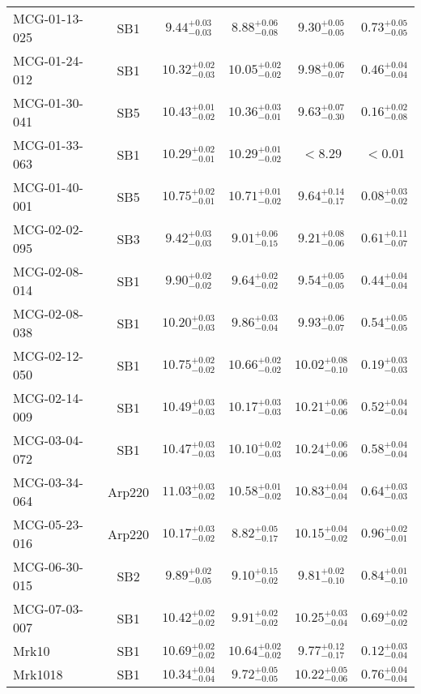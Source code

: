 \documentclass[onecolumn]{mn2e}
\begin{document}
{\begin{center}
\begin{longtable}{lccccc}
MCG-01-13-025 & SB1 & $9.44_{-0.03}^{+0.03}$ & $8.88_{-0.08}^{+0.06}$ & $9.30_{-0.05}^{+0.05}$ &$0.73_{-0.05}^{+0.05}$ \\
MCG-01-24-012 & SB1 & $10.32_{-0.03}^{+0.02}$ & $10.05_{-0.02}^{+0.02}$ & $9.98_{-0.07}^{+0.06}$ &$0.46_{-0.04}^{+0.04}$ \\
MCG-01-30-041 & SB5 & $10.43_{-0.02}^{+0.01}$ & $10.36_{-0.01}^{+0.03}$ & $9.63_{-0.30}^{+0.07}$ &$0.16_{-0.08}^{+0.02}$ \\
MCG-01-33-063 & SB1 & $10.29_{-0.01}^{+0.02}$ & $10.29_{-0.02}^{+0.01}$ & $<8.29$ &$<0.01$ \\
MCG-01-40-001 & SB5 & $10.75_{-0.01}^{+0.02}$ & $10.71_{-0.02}^{+0.01}$ & $9.64_{-0.17}^{+0.14}$ &$0.08_{-0.02}^{+0.03}$ \\
MCG-02-02-095 & SB3 & $9.42_{-0.03}^{+0.03}$ & $9.01_{-0.15}^{+0.06}$ & $9.21_{-0.06}^{+0.08}$ &$0.61_{-0.07}^{+0.11}$ \\
MCG-02-08-014 & SB1 & $9.90_{-0.02}^{+0.02}$ & $9.64_{-0.02}^{+0.02}$ & $9.54_{-0.05}^{+0.05}$ &$0.44_{-0.04}^{+0.04}$ \\
MCG-02-08-038 & SB1 & $10.20_{-0.03}^{+0.03}$ & $9.86_{-0.04}^{+0.03}$ & $9.93_{-0.07}^{+0.06}$ &$0.54_{-0.05}^{+0.05}$ \\
MCG-02-12-050 & SB1 & $10.75_{-0.02}^{+0.02}$ & $10.66_{-0.02}^{+0.02}$ & $10.02_{-0.10}^{+0.08}$ &$0.19_{-0.03}^{+0.03}$ \\
MCG-02-14-009 & SB1 & $10.49_{-0.03}^{+0.03}$ & $10.17_{-0.03}^{+0.03}$ & $10.21_{-0.06}^{+0.06}$ &$0.52_{-0.04}^{+0.04}$ \\
MCG-03-04-072 & SB1 & $10.47_{-0.03}^{+0.03}$ & $10.10_{-0.03}^{+0.02}$ & $10.24_{-0.06}^{+0.06}$ &$0.58_{-0.04}^{+0.04}$ \\
MCG-03-34-064 & Arp220 & $11.03_{-0.02}^{+0.03}$ & $10.58_{-0.02}^{+0.01}$ & $10.83_{-0.04}^{+0.04}$ &$0.64_{-0.03}^{+0.03}$ \\
MCG-05-23-016 & Arp220 & $10.17_{-0.02}^{+0.03}$ & $8.82_{-0.17}^{+0.05}$ & $10.15_{-0.02}^{+0.04}$ &$0.96_{-0.01}^{+0.02}$ \\
MCG-06-30-015 & SB2 & $9.89_{-0.05}^{+0.02}$ & $9.10_{-0.02}^{+0.15}$ & $9.81_{-0.10}^{+0.02}$ &$0.84_{-0.10}^{+0.01}$ \\
MCG-07-03-007 & SB1 & $10.42_{-0.02}^{+0.02}$ & $9.91_{-0.02}^{+0.02}$ & $10.25_{-0.04}^{+0.03}$ &$0.69_{-0.02}^{+0.02}$ \\
Mrk10 & SB1 & $10.69_{-0.02}^{+0.02}$ & $10.64_{-0.02}^{+0.02}$ & $9.77_{-0.17}^{+0.12}$ &$0.12_{-0.04}^{+0.03}$ \\
Mrk1018 & SB1 & $10.34_{-0.04}^{+0.04}$ & $9.72_{-0.05}^{+0.05}$ & $10.22_{-0.06}^{+0.05}$ &$0.76_{-0.04}^{+0.04}$ \\

\end{longtable}
\end{center}}
\end{document}
